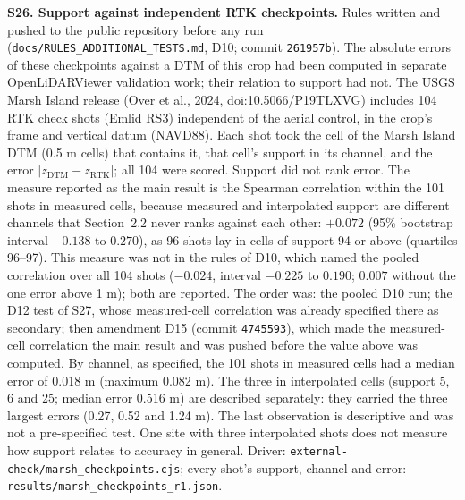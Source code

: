 \documentclass[11pt]{article}
\begin{document}
\vspace{4mm}
\noindent\textbf{S26. Support against independent RTK checkpoints.} Rules written and pushed to the public repository before any run (\texttt{docs/\allowbreak RULES\_\allowbreak ADDITIONAL\_\allowbreak TESTS.md}, D10; commit \texttt{261957b}). The absolute errors of these checkpoints against a DTM of this crop had been computed in separate OpenLiDARViewer validation work; their relation to support had not. The USGS Marsh Island release (Over et al., 2024, doi:10.5066/P19TLXVG) includes 104 RTK check shots (Emlid RS3) independent of the aerial control, in the crop's frame and vertical datum (NAVD88). Each shot took the cell of the Marsh Island DTM (0.5 m cells) that contains it, that cell's support in its channel, and the error $|z_{\mathrm{DTM}}-z_{\mathrm{RTK}}|$; all 104 were scored. Support did not rank error. The measure reported as the main result is the Spearman correlation within the 101 shots in measured cells, because measured and interpolated support are different channels that Section~2.2 never ranks against each other: $+0.072$ (95\% bootstrap interval $-0.138$ to $0.270$), as 96 shots lay in cells of support 94 or above (quartiles 96--97). This measure was not in the rules of D10, which named the pooled correlation over all 104 shots ($-0.024$, interval $-0.225$ to $0.190$; $0.007$ without the one error above 1 m); both are reported. The order was: the pooled D10 run; the D12 test of S27, whose measured-cell correlation was already specified there as secondary; then amendment D15 (commit \texttt{4745593}), which made the measured-cell correlation the main result and was pushed before the value above was computed. By channel, as specified, the 101 shots in measured cells had a median error of 0.018 m (maximum 0.082 m). The three in interpolated cells (support 5, 6 and 25; median error 0.516 m) are described separately: they carried the three largest errors (0.27, 0.52 and 1.24 m). The last observation is descriptive and was not a pre-specified test. One site with three interpolated shots does not measure how support relates to accuracy in general. Driver: \texttt{external-check/marsh\_checkpoints.cjs}; every shot's support, channel and error: \texttt{results/marsh\_checkpoints\_r1.json}.
\end{document}
